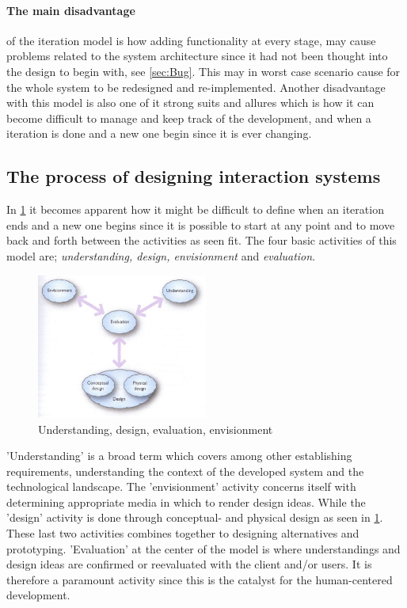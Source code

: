 \paragraph{The main disadvantage} of the iteration model is how adding functionality at every stage, may cause problems related to the system architecture since it had not been thought into the design to begin with, see \cref{sec:Bug}.
This may in worst case scenario cause for the whole system to be redesigned and re-implemented.
Another disadvantage with this model is also one of it strong suits and allures which is how it can become difficult to manage and keep track of the development, and when a iteration is done and a new one begin since it is ever changing.

\subsection{The process of designing interaction systems}\label{sec:Iterative1}
In \cref{fig:DEBModel} it becomes apparent how it might be difficult to define when an iteration ends and a new one begins since it is possible to start at any point and to move back and forth between the activities as seen fit.
The four basic activities of this model are; \textit{understanding, design, envisionment} and \textit{evaluation}.

\begin{figure}[H]
	\centering
	\includegraphics[width=0.5\textwidth]{billeder/DEBModel.jpg}
	\caption{Understanding, design, evaluation, envisionment \citep[p.~49]{Benyon}}\label{fig:DEBModel}
\end{figure}
'Understanding' is a broad term which covers among other establishing requirements, understanding the context of the developed system and the technological landscape.
The 'envisionment' activity concerns itself with determining appropriate media in which to render design ideas.
While the 'design' activity is done through conceptual- and physical design as seen in \cref{fig:DEBModel}.
These last two activities combines together to designing alternatives and prototyping.
'Evaluation' at the center of the model is where understandings and design ideas are confirmed or reevaluated with the client and/or users.
It is therefore a paramount activity since this is the catalyst for the human-centered development.

